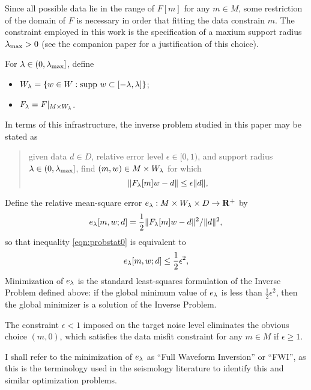 Since
all possible data lie in the range of $F[m]$ for any $m \in M$, some
restriction of the domain of $F$ is necessary in order that fitting
the data constrain $m$. The constraint employed in this work is the specification
of a maxium support radius $\lambda_{\rm max} >0$ (see the companion
paper \cite{SymesChenMinkoff:21} for a justification of this choice).

For
$\lambda \in (0,\lambda_{\rm max}]$, define
\begin{itemize}
\item $W_{\lambda} = \{w \in W:
  \mbox{supp }w \subset [-\lambda,\lambda]\}$;
\item $F_{\lambda} = F|_{M \times W_{\lambda}}$.
\end{itemize}

In terms of this infrastructure, the inverse problem studied in 
this paper may be stated as

\begin{quote}
  given data $d \in D$, relative error level $\epsilon \in
  [0,1)$, and support radius $\lambda \in (0, \lambda_{\rm
    max}]$, find $(m,w) \in M \times W_{\lambda}$ for which 
\begin{equation}
  \label{eqn:probstat0}  \|F_{\lambda}[m]w-d\| \le \epsilon\|d\|,
\end{equation}
\end{quote}

Define the relative mean-square error $e_{\lambda}: M \times W_{\lambda} \times D
\rightarrow {\bf R}^+$ by
\begin{equation}
  \label{eqn:redms}
  e_{\lambda}[m,w;d]=\frac{1}{2}\|F_{\lambda}[m]w-d\|^2/\|d\|^2,
\end{equation}
so that inequality \ref{eqn:probstat0} is equivalent to
\begin{equation}
  \label{eqn:probstat1}
  e_{\lambda}[m,w;d] \le \frac{1}{2}\epsilon^2,
\end{equation}
Minimization of $e_{\lambda}$ is the standard least-squares formulation of
the Inverse Problem defined above: if the global minimum value of
$e_{\lambda}$ is less than $\frac{1}{2}\epsilon^2$, then the global
minimizer is a solution of the Inverse Problem.

 The constraint $\epsilon < 1$ imposed on the
target noise level eliminates the obvious choice $(m,0)$, which
satisfies the data misfit constraint for any $m \in M$ if $\epsilon
\ge 1$. 

 I shall refer to the minimization of $e_{\lambda}$ as
``Full Waveform Inversion'' or ``FWI'', as this is the
terminology used in the seismology literature to identify this and
similar optimization problems.

